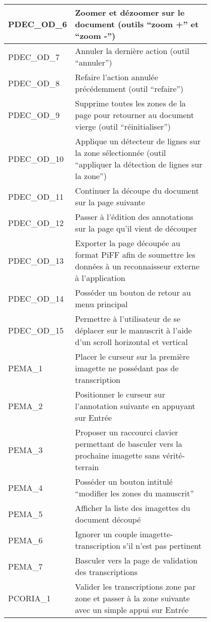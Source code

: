 \begin{center}
\begin{tabular}{ | l | p{0.8\linewidth} | }
        \hline
        PDEC\_OD\_6 & Zoomer et dézoomer sur le document (outils “zoom +” et “zoom -”) \\
        \hline
        PDEC\_OD\_7 & Annuler la dernière action (outil “annuler”) \\
        \hline
        PDEC\_OD\_8 & Refaire l’action annulée précédemment (outil “refaire”) \\
        \hline
        PDEC\_OD\_9 & Supprime toutes les zones de la page pour retourner au document vierge (outil “réinitialiser”) \\
        \hline
        PDEC\_OD\_10 & Applique un détecteur de lignes sur la zone sélectionnée (outil “appliquer la détection de lignes sur la zone”) \\
        \hline
        PDEC\_OD\_11 & Continuer la découpe du document sur la page suivante \\
        \hline
        PDEC\_OD\_12 & Passer à l’édition des annotations sur la page qu’il vient de découper \\
        \hline
        PDEC\_OD\_13 & Exporter la page découpée au format PiFF afin de soumettre les données à un reconnaisseur externe à l’application \\
        \hline
        PDEC\_OD\_14 & Posséder un bouton de retour au menu principal \\
        \hline
        PDEC\_OD\_15 & Permettre à l’utilisateur de se déplacer sur le manuscrit à l’aide d’un scroll horizontal et vertical \\
        \hline
        PEMA\_1 & Placer le curseur sur la première imagette ne possédant pas de transcription \\
        \hline
        PEMA\_2 & Positionner le curseur sur l’annotation suivante en appuyant sur Entrée \\
        \hline
        PEMA\_3 & Proposer un raccourci clavier permettant de basculer vers la prochaine imagette sans vérité-terrain \\
        \hline
        PEMA\_4 & Posséder un bouton intitulé “modifier les zones du manuscrit” \\
        \hline
        PEMA\_5 & Afficher la liste des imagettes du document découpé \\
        \hline
        PEMA\_6 & Ignorer un couple imagette-transcription s’il n’est pas pertinent \\
        \hline
        PEMA\_7 & Basculer vers la page de validation des transcriptions \\
        \hline
        PCORIA\_1 & Valider les transcriptions zone par zone et passer à la zone suivante avec un simple appui sur Entrée \\

\end{tabular}
\end{center}

